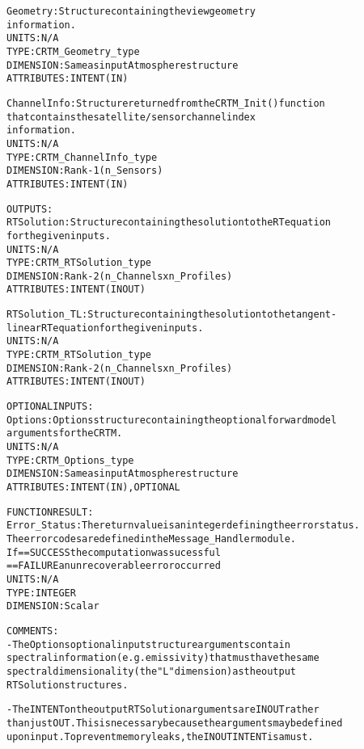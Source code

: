 \begin{alltt}
        Geometry:       Structure containing the view geometry
                        information.
                        UNITS:      N/A
                        TYPE:       CRTM_Geometry_type
                        DIMENSION:  Same as input Atmosphere structure
                        ATTRIBUTES: INTENT(IN)
 
        ChannelInfo:    Structure returned from the CRTM_Init() function
                        that contains the satellite/sensor channel index
                        information.
                        UNITS:      N/A
                        TYPE:       CRTM_ChannelInfo_type
                        DIMENSION:  Rank-1 (n_Sensors)
                        ATTRIBUTES: INTENT(IN)
 
  OUTPUTS:
        RTSolution:     Structure containing the solution to the RT equation
                        for the given inputs.
                        UNITS:      N/A
                        TYPE:       CRTM_RTSolution_type
                        DIMENSION:  Rank-2 (n_Channels x n_Profiles)
                        ATTRIBUTES: INTENT(IN OUT)
 
        RTSolution_TL:  Structure containing the solution to the tangent-
                        linear RT equation for the given inputs.
                        UNITS:      N/A
                        TYPE:       CRTM_RTSolution_type
                        DIMENSION:  Rank-2 (n_Channels x n_Profiles)
                        ATTRIBUTES: INTENT(IN OUT)
 
  OPTIONAL INPUTS:
        Options:        Options structure containing the optional forward model
                        arguments for the CRTM.
                        UNITS:      N/A
                        TYPE:       CRTM_Options_type
                        DIMENSION:  Same as input Atmosphere structure
                        ATTRIBUTES: INTENT(IN), OPTIONAL
 
  FUNCTION RESULT:
        Error_Status:   The return value is an integer defining the error status.
                        The error codes are defined in the Message_Handler module.
                        If == SUCCESS the computation was sucessful
                           == FAILURE an unrecoverable error occurred
                        UNITS:      N/A
                        TYPE:       INTEGER
                        DIMENSION:  Scalar
 
  COMMENTS:
        - The Options optional input structure arguments contain
          spectral information (e.g. emissivity) that must have the same
          spectral dimensionality (the "L" dimension) as the output
          RTSolution structures.
 
        - The INTENT on the output RTSolution arguments are IN OUT rather
          than just OUT. This is necessary because the arguments may be defined
          upon input. To prevent memory leaks, the IN OUT INTENT is a must.
 
  \end{alltt}
